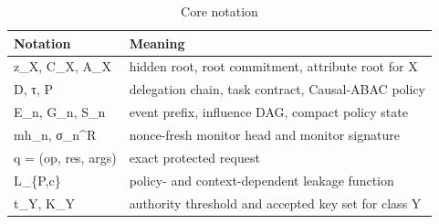 \begin{table}[t]
\centering
\caption{Core notation}
\begin{tabular}{ll}
\hline
Notation & Meaning \\
\hline
z\_X, C\_X, A\_X & hidden root, root commitment, attribute root for X \\
D, τ, P & delegation chain, task contract, Causal-ABAC policy \\
E\_n, G\_n, S\_n & event prefix, influence DAG, compact policy state \\
mh\_n, σ\_n^R & nonce-fresh monitor head and monitor signature \\
q = (op, res, args) & exact protected request \\
L\_\{P,c\} & policy- and context-dependent leakage function \\
t\_Y, K\_Y & authority threshold and accepted key set for class Y \\
\hline
\end{tabular}
\end{table}
